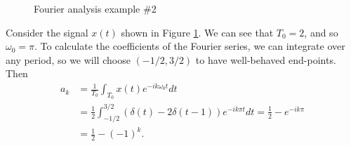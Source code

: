 \begin{exmp}
    \begin{figure}[hp!]
        \centering
    \caption{Fourier analysis example \#2}
    \label{fig:fourier-step-example}
    \end{figure}

    Consider the signal $x(t)$ shown in Figure \ref{fig:fourier-step-example}. We can see that $T_0 = 2$, and so $\omega_0 = \pi$. To calculate the coefficients of the Fourier series, we can integrate over any period, so we will choose $(-1/2, 3/2)$ to have well-behaved end-points. Then
    \begin{align*}
        a_k &= \frac{1}{T_0}\int_{T_0}x(t)e^{-ik\omega_0t}dt\\
        &= \frac{1}{2}\int_{-1/2}^{3/2}\left(\delta(t) - 2\delta(t-1)\right)e^{-ik\pi t}dt = \frac{1}{2} - e^{-ik\pi} \\
        &= \frac{1}{2} - (-1)^k.
    \end{align*}
\end{exmp}
